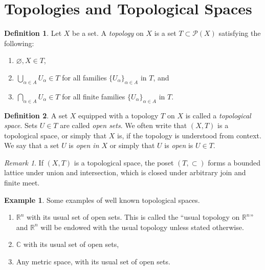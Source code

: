 \documentclass{book}
\theoremstyle{definition}
\newtheorem{definition}{Definition}[section]
\newtheorem{example}{Example}[section]
\theoremstyle{remark}
\newtheorem{remark}{Remark}[section]
\newcommand{\R}{\mathbb{R}}
\newcommand{\C}{\mathbb{C}}
\begin{document}
\section{Topologies and Topological Spaces}
\begin{definition}
Let $X$ be a set. A \textit{topology} on $X$ is a set $T\subset\mathcal P(X)$ satisfying the following:
\begin{enumerate}
    \item $\varnothing,X\in T$,
    \item $\bigcup_{\alpha\in A} U_\alpha\in T$ for all families $\{U_\alpha\}_{\alpha\in A}$ in $T$, and
    \item $\bigcap_{\alpha\in A} U_\alpha\in T$ for all finite families $\{U_\alpha\}_{\alpha\in A}$ in $T$.
\end{enumerate}
\end{definition}

\begin{definition}
A set $X$ equipped with a topology $T$ on $X$ is called a \textit{topological space}. Sets $U\in T$ are called \textit{open sets}. We often write that $(X,T)$ is a topological space, or simply that $X$ is, if the topology is understood from context. We say that a set $U$ is \textit{open in $X$} or simply that $U$ is \textit{open} is $U\in T$.
\end{definition}

\begin{remark}
If $(X,T)$ is a topological space, the poset $(T,\subset)$ forms a bounded lattice under union and intersection, which is closed under arbitrary join and finite meet.
\end{remark}

\begin{example}
Some examples of well known topological spaces.
\begin{enumerate}
    \item $\R^n$ with its usual set of open sets. This is called the ``usual topology on $\R^n$'' and $\R^n$ will be endowed with the usual topology unless stated otherwise.
    \item $\C$ with its usual set of open sets,
    \item Any metric space, with its usual set of open sets.
\end{enumerate}
\end{example}
\end{document}
